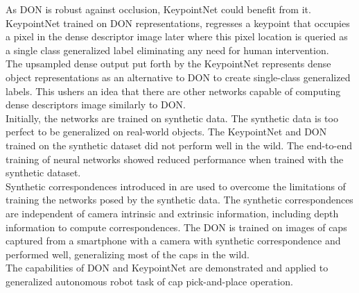 As \ac{DON} is robust against occlusion, KeypointNet could benefit from it. KeypointNet trained on \ac{DON} representations, regresses a keypoint that occupies a pixel in the dense descriptor image later where
this pixel location is queried as a single class generalized label eliminating any need for
human intervention.\\

The upsampled dense output put forth by the KeypointNet represents dense object representations as an alternative to \ac{DON} to create single-class
generalized labels. This ushers an idea that there are other networks capable of computing
dense descriptors image similarly to \ac{DON}.\\


Initially, the networks are trained on synthetic data. The synthetic data is too perfect to be generalized on real-world objects. The KeypointNet and \ac{DON} trained
on the synthetic dataset did not perform well in the wild. The end-to-end training of neural networks showed reduced performance when trained with the synthetic dataset.\\

Synthetic correspondences introduced in \cite{adrian2022efficient} are used to overcome the limitations of training the networks posed by the synthetic data.
The synthetic correspondences are independent of camera intrinsic and extrinsic information, including depth information to compute correspondences.
The \ac{DON} is trained on images of caps captured from a smartphone with a camera with synthetic correspondence and performed well, generalizing most of the caps in the wild.\\

The capabilities of \ac{DON} and KeypointNet are demonstrated and applied to generalized autonomous robot task of cap pick-and-place operation.